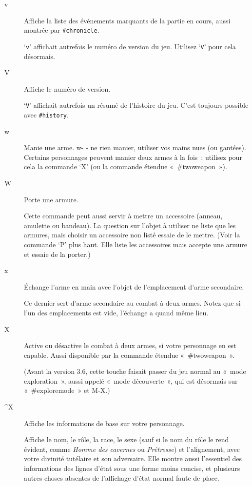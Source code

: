 \documentclass[titlepage]{article}
\begin{document}
\begin{description}
\item[{v}]
Affiche la liste des événements marquants de la partie en cours, aussi
montrée par \texttt{\#chronicle}.


`\texttt{v}' affichait autrefois le numéro de version du jeu.
Utilisez `\texttt{V}' pour cela désormais.

\item[{V}]
Affiche le numéro de version.


`\texttt{V}' affichait autrefois un résumé de l'histoire du jeu.
C'est toujours possible avec \texttt{\#history}.

\item[{w}]
Manie une arme.
w- - ne rien manier, utiliser vos mains nues (ou gantées).\\
Certains personnages peuvent manier deux armes à la fois~; utilisez pour
cela la commande `X' (ou la commande étendue «~\#twoweapon~»).

\item[{W}]
Porte une armure.


Cette commande peut aussi servir à mettre un accessoire (anneau, amulette
ou bandeau).
La question sur l'objet à utiliser ne liste que les armures, mais choisir
un accessoire non listé essaie de le mettre.
(Voir la commande `P' plus haut.
Elle liste les accessoires mais accepte une armure et essaie de la
porter.)

\item[{x}]
Échange l'arme en main avec l'objet de l'emplacement d'arme secondaire.


Ce dernier sert d'arme secondaire au combat à deux armes.
Notez que si l'un des emplacements est vide, l'échange a quand même lieu.

\item[{X}]
Active ou désactive le combat à deux armes, si votre personnage en est
capable.
Aussi disponible par la commande étendue «~\#twoweapon~».


(Avant la version 3.6, cette touche faisait passer du jeu normal au
«~mode exploration~», aussi appelé «~mode découverte~», qui
est désormais sur «~\#exploremode~» et M-X.)

\item[{\textasciicircum{}X}]
Affiche les informations de base sur votre personnage.


Affiche le nom, le rôle, la race, le sexe (sauf si le nom du rôle le rend
évident, comme \textit{Homme des cavernes} ou \textit{Prêtresse}) et
l'alignement, avec votre divinité tutélaire et son adversaire.
Elle montre aussi l'essentiel des informations des lignes d'état sous une
forme moins concise, et plusieurs autres choses absentes de l'affichage
d'état normal faute de place.



\end{description}
\end{document}

